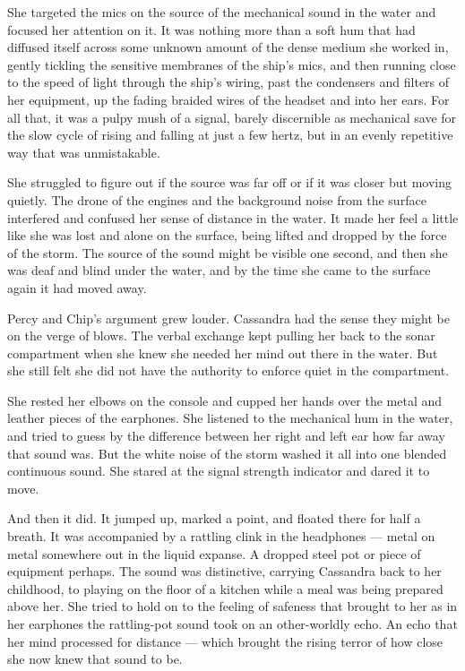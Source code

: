 \documentclass[
]{scrbook}
\begin{document}
She targeted the mics on the source of the mechanical sound in the water
and focused her attention on it. It was nothing more than a soft hum
that had diffused itself across some unknown amount of the dense medium
she worked in, gently tickling the sensitive membranes of the ship's
mics, and then running close to the speed of light through the ship's
wiring, past the condensers and filters of her equipment, up the fading
braided wires of the headset and into her ears. For all that, it was a
pulpy mush of a signal, barely discernible as mechanical save for the
slow cycle of rising and falling at just a few hertz, but in an evenly
repetitive way that was unmistakable.

She struggled to figure out if the source was far off or if it was
closer but moving quietly. The drone of the engines and the background
noise from the surface interfered and confused her sense of distance in
the water. It made her feel a little like she was lost and alone on the
surface, being lifted and dropped by the force of the storm. The source
of the sound might be visible one second, and then she was deaf and
blind under the water, and by the time she came to the surface again it
had moved away.

Percy and Chip's argument grew louder. Cassandra had the sense they
might be on the verge of blows. The verbal exchange kept pulling her
back to the sonar compartment when she knew she needed her mind out
there in the water. But she still felt she did not have the authority to
enforce quiet in the compartment.

She rested her elbows on the console and cupped her hands over the metal
and leather pieces of the earphones. She listened to the mechanical hum
in the water, and tried to guess by the difference between her right and
left ear how far away that sound was. But the white noise of the storm
washed it all into one blended continuous sound. She stared at the
signal strength indicator and dared it to move.

And then it did. It jumped up, marked a point, and floated there for
half a breath. It was accompanied by a rattling clink in the headphones
--- metal on metal somewhere out in the liquid expanse. A dropped steel
pot or piece of equipment perhaps. The sound was distinctive, carrying
Cassandra back to her childhood, to playing on the floor of a kitchen
while a meal was being prepared above her. She tried to hold on to the
feeling of safeness that brought to her as in her earphones the
rattling-pot sound took on an other-worldly echo. An echo that her mind
processed for distance --- which brought the rising terror of how close
she now knew that sound to be.
\end{document}
